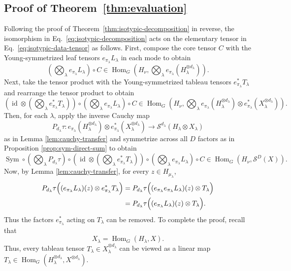\documentclass[11pt]{article}
\newcommand{\scS}{\mathcal{S}}
\newcommand{\HomG}[2]{\operatorname{Hom}_G\!\left(#1,#2\right)}
\newcommand{\Sym}{\operatorname{Sym}}
\newcommand{\id}{\operatorname{id}}
\theoremstyle{definition}
\begin{document}
\subsection{Proof of Theorem~\ref{thm:evaluation}}\label{sec:proof-evaluation}
Following the proof of Theorem~\ref{thm:isotypic-decomposition} in reverse, the isomorphism in Eq.~\eqref{eq:isotypic-decomposition} acts on the elementary tensor in Eq.~\eqref{eq:isotypic-data-tensor} as follows.
First, compose the core tensor $C$ with the Young-symmetrized leaf tensors $e_{\pi_\lambda} L_\lambda$ in each mode to obtain
\[
  \left(\bigotimes_\lambda e_{\pi_\lambda} L_\lambda\right)
  \circ
  C
  \in \HomG{H_\nu}{\bigotimes_\lambda e_{\pi_\lambda}(H_\lambda^{\otimes d_\lambda})}.
\]
Next, take the tensor product with the Young-symmetrized tableau tensors $e_{\pi_\lambda}^*T_\lambda$ and rearrange the tensor product to obtain
\[
  \left(\id \otimes \left(\bigotimes_\lambda e_{\pi_\lambda}^*T_\lambda\right)\right)
  \circ
  \left(\bigotimes_\lambda e_{\pi_\lambda} L_\lambda\right)
  \circ
  C
  \in \HomG{H_\nu}{\bigotimes_\lambda e_{\pi_\lambda}(H_\lambda^{\otimes d_\lambda})
  \otimes
  e_{\pi_\lambda}^*(X_\lambda^{\otimes d_\lambda})}.
\]
Then, for each $\lambda$, apply the inverse Cauchy map
\[
  P_{d_\lambda}\tau:
  e_{\pi_\lambda}(H_\lambda^{\otimes d_\lambda})\otimes e_{\pi_\lambda}^*(X_\lambda^{\otimes d_\lambda})
  \longrightarrow
  \scS^{d_\lambda}(H_\lambda\otimes X_\lambda)
\]
as in Lemma \ref{lem:cauchy-transfer} and symmetrize across all $D$ factors as in Proposition \ref{prop:sym-direct-sum} to obtain
\[
  \Sym
  \circ
  \left(\bigotimes_\lambda P_{d_\lambda}\tau\right)
  \circ
  \left(\id \otimes \left(\bigotimes_\lambda e_{\pi_\lambda}^*T_\lambda\right)\right)
  \circ
  \left(\bigotimes_\lambda e_{\pi_\lambda} L_\lambda\right)
  \circ
  C
  \in \HomG{H_\nu}{\scS^D(X)}.
\]
Now, by Lemma \ref{lem:cauchy-transfer}, for every $z\in H_{\mu_\lambda}$,
\begin{align*}
  P_{d_\lambda}\tau\Bigl((e_{\pi_\lambda}L_\lambda)(z)\otimes e_{\pi_\lambda}^*T_\lambda\Bigr)
  &=
  P_{d_\lambda}\tau\Bigl((e_{\pi_\lambda}e_{\pi_\lambda}L_\lambda)(z)\otimes T_\lambda\Bigr) \\
  &=
  P_{d_\lambda}\tau\Bigl((e_{\pi_\lambda}L_\lambda)(z)\otimes T_\lambda\Bigr).
\end{align*}
Thus the factors $e_{\pi_\lambda}^*$ acting on $T_\lambda$ can be removed.
To complete the proof, recall that
\[
  X_\lambda = \HomG{H_\lambda}{X}.
\]
Thus, every tableau tensor $T_\lambda\in X_\lambda^{\otimes d_\lambda}$ can be viewed as a linear map $T_\lambda \in \HomG{H_\lambda^{\otimes d_\lambda}}{X^{\otimes d_\lambda}}$.
\end{document}
